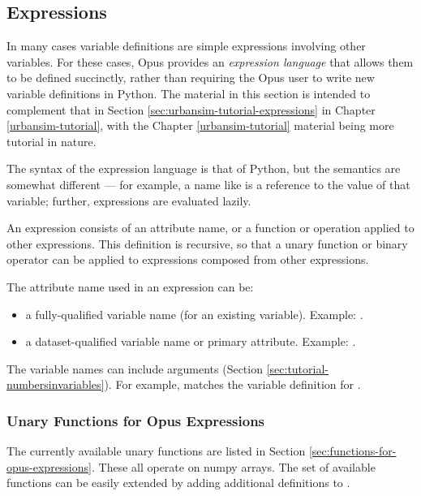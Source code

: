 {\subsection{Expressions}
\label{sec:opus-core-expressions}

In many cases variable definitions are simple expressions involving other
variables.  For these cases, Opus provides an \emph{expression language}
that allows them to be defined succinctly, rather than requiring the Opus
user to write new variable definitions in Python.  The material in this
section is intended to complement that in Section
\ref{sec:urbansim-tutorial-expressions} in Chapter \ref{urbansim-tutorial},
with the Chapter \ref{urbansim-tutorial} material being more tutorial in
nature.

The syntax of the expression language is that of Python, but the semantics
are somewhat different --- for example, a name like
 is a reference to the value of that
variable; further, expressions are evaluated lazily.

An expression consists of an attribute name, or a function or operation
applied to other expressions.  This definition is recursive, so that a
unary function or binary operator can be applied to expressions composed
from other expressions.

The attribute name used in an expression can be:

\begin{itemize}
\item a fully-qualified variable name (for an existing variable).  Example:
.

\item a dataset-qualified variable name or primary attribute.
Example: .
\end{itemize}

The variable names can include arguments (Section
\ref{sec:tutorial-numbersinvariables}).  For example,
 matches the variable definition
for .

\subsubsection{Unary Functions for Opus Expressions}

The currently available unary functions are listed in Section
\ref{sec:functions-for-opus-expressions}.  These all operate 
on numpy arrays.  The set of available functions can be easily 
extended by adding additional definitions to 
.

}
